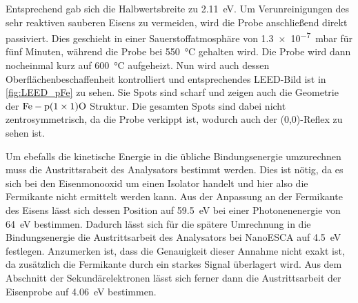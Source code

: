         Entsprechend gab sich die Halbwertsbreite zu \SI{2.11}{\electronvolt}.
        Um Verunreinigungen des sehr reaktiven sauberen Eisens zu vermeiden, wird die Probe anschließend direkt passiviert.
        Dies geschieht in einer Sauerstoffatmosphäre von \SI{1.3e-7}{\milli\bar} für fünf Minuten, während die Probe bei \SI{550}{\celsius} gehalten wird.
        Die Probe wird dann nocheinmal kurz auf \SI{600}{\celsius} aufgeheizt.
        Nun wird auch dessen Oberflächenbeschaffenheit kontrolliert und entsprechendes LEED-Bild ist in \autoref{fig:LEED_pFe} zu sehen.
        Sie Spots sind scharf und zeigen auch die Geometrie der $\ce{Fe}-\text{p}(1 \times 1)\ce{O}$ Struktur.
        Die gesamten Spots sind dabei nicht zentrosymmetrisch, da die Probe verkippt ist, wodurch auch der (0,0)-Reflex zu sehen ist.

        Um ebefalls die kinetische Energie in die übliche Bindungsenergie umzurechnen muss die Austrittsrabeit des Analysators bestimmt werden.
        Dies ist nötig, da es sich bei den Eisenmonooxid um einen Isolator handelt und hier also die Fermikante nicht ermittelt werden kann.
        Aus der Anpassung an der Fermikante des Eisens lässt sich dessen Position auf \SI{59.5}{\electronvolt} bei einer Photonenenergie von \SI{64}{\electronvolt} bestimmen.
        Dadurch lässt sich für die spätere Umrechnung in die Bindungsenergie die Austrittsarbeit des Analysators bei NanoESCA auf \SI{4.5}{\electronvolt} festlegen.
        Anzumerken ist, dass die Genauigkeit dieser Annahme nicht exakt ist, da zusätzlich die Fermikante durch ein starkes Signal überlagert wird.
        Aus dem Abschnitt der Sekundärelektronen lässt sich ferner dann die Austrittsarbeit der Eisenprobe auf \SI{4.06}{\electronvolt} bestimmen.
        
